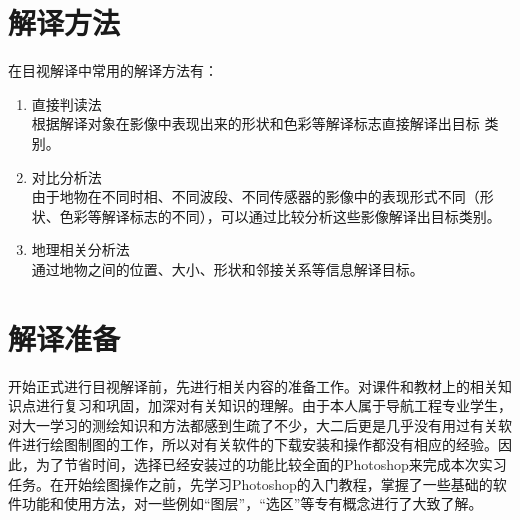 \documentclass{ctexart}
\begin{document}
\section{解译方法}
在目视解译中常用的解译方法有：
\begin{enumerate}
\item 直接判读法\\
根据解译对象在影像中表现出来的形状和色彩等解译标志直接解译出目标
类别。
\item 对比分析法\\
由于地物在不同时相、不同波段、不同传感器的影像中的表现形式不同（形
状、色彩等解译标志的不同），可以通过比较分析这些影像解译出目标类别。
\item 地理相关分析法\\
通过地物之间的位置、大小、形状和邻接关系等信息解译目标。
\end{enumerate}

\section{解译准备}
开始正式进行目视解译前，先进行相关内容的准备工作。对课件和教材上的相关知识点进行复习和巩固，加深对有关知识的理解。由于本人属于导航工程专业学生，对大一学习的测绘知识和方法都感到生疏了不少，大二后更是几乎没有用过有关软件进行绘图制图的工作，所以对有关软件的下载安装和操作都没有相应的经验。因此，为了节省时间，选择已经安装过的功能比较全面的Photoshop来完成本次实习任务。在开始绘图操作之前，先学习Photoshop的入门教程，掌握了一些基础的软件功能和使用方法，对一些例如“图层”，“选区”等专有概念进行了大致了解。
\end{document}
